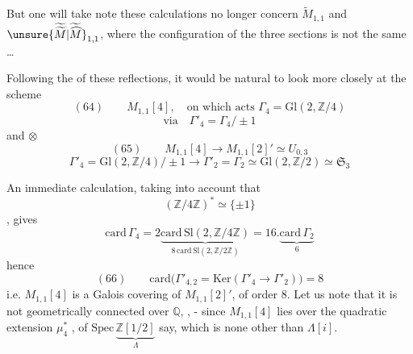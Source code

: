 But one will take note 
these calculations no longer concern $\widetilde M_{1,1}$ and
$\unsure{\widetilde{\widetilde M}|\widetilde{\widehat M}}_{1,1}$,
where the configuration of the three sections
is not the same \ldots


Following the  of these reflections, it would be natural to look
more closely at the scheme
\[
(64)\qquad
M_{1,1}[4],\quad
\text{on which acts }\Gamma_4=\mathrm{Gl}(2,\mathbb Z/4)
\]
\[
\text{via}\quad \Gamma'_4=\Gamma_4/\pm1
\]
and  $\otimes$
\[
(65)\qquad
M_{1,1}[4]\longrightarrow M_{1,1}[2]'\simeq U_{0,3}
\]
 
\[
\Gamma'_4=\mathrm{Gl}(2,\mathbb Z/4)/\pm1
\longrightarrow
\Gamma'_2=\Gamma_2\simeq\mathrm{Gl}(2,\mathbb Z/2)
\simeq\mathfrak S_3
\]

An immediate calculation, taking into account that
\[
(\mathbb Z/4\mathbb Z)^*\simeq\{\pm1\}
\]
, gives
\[
\mathrm{card}\,\Gamma_4
=
2\underbrace{\mathrm{card}\,\mathrm{Sl}(2,\mathbb Z/4\mathbb Z)}
_{8\,\mathrm{card}\,\mathrm{Sl}(2,\mathbb Z/2\mathbb Z)}
=
16.\underbrace{\mathrm{card}\,\Gamma_2}_{6}
\]
hence
\[
(66)\qquad
\mathrm{card}\bigl(\Gamma'_{4,2}
=\mathrm{Ker}(\Gamma'_4\longrightarrow\Gamma'_2)\bigr)=8
\]
i.e. $M_{1,1}[4]$ is a Galois covering of $M_{1,1}[2]'$,
of  order $8$.
Let us note that it is not geometrically connected over $\mathbb Q$,
,
- since $M_{1,1}[4]$ lies over the quadratic extension
$\mu_4^*$ , of
$\mathrm{Spec}\,\underbrace{\mathbb Z[1/2]}_{\Lambda}$ say,
which is none other than $\Lambda[i]$.

